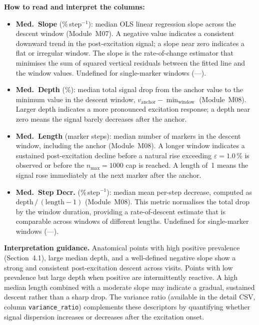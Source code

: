 \documentclass[a4paper,11pt]{article}
\begin{document}
\medskip
\noindent\textbf{How to read and interpret the columns:}

\begin{itemize}

  \item \textbf{Med.\ Slope} (\%\,step$^{-1}$): median OLS linear regression slope across
        the descent window (Module~M07). A negative value indicates a consistent downward
        trend in the post-excitation signal; a slope near zero indicates a flat or irregular
        window. The slope is the rate-of-change estimator that minimises the sum of squared
        vertical residuals between the fitted line and the window values. Undefined for
        single-marker windows (---).

  \item \textbf{Med.\ Depth} (\%): median total signal drop from the anchor value to the
        minimum value in the descent window,
        $v_{\mathrm{anchor}} - \min_{\mathrm{window}}$ (Module~M08). Larger depth indicates
        a more pronounced excitation response; a depth near zero means the signal barely
        decreases after the anchor.

  \item \textbf{Med.\ Length} (marker steps): median number of markers in the descent
        window, including the anchor (Module~M08). A longer window indicates a sustained
        post-excitation decline before a natural rise exceeding
        $\varepsilon = 1.0\,\%$ is observed or before the
        $n_{\max} = 1000$ cap is reached. A length of~1 means the signal rose
        immediately at the next marker after the anchor.

  \item \textbf{Med.\ Step Decr.} (\%\,step$^{-1}$): median mean per-step decrease,
        computed as $\mathrm{depth}\,/\,(\mathrm{length} - 1)$ (Module~M08). This metric
        normalises the total drop by the window duration, providing a rate-of-descent
        estimate that is comparable across windows of different lengths. Undefined for
        single-marker windows (---).

\end{itemize}

\medskip
\noindent\textbf{Interpretation guidance.}
Anatomical points with high positive prevalence (Section~4.1), large median depth, and a
well-defined negative slope show a strong and consistent post-excitation descent across
visits.
Points with low prevalence but large depth when positive are intermittently reactive.
A high median length combined with a moderate slope may indicate a gradual, sustained
descent rather than a sharp drop.
The variance ratio (available in the detail CSV, column \texttt{variance\_ratio}) complements
these descriptors by quantifying whether signal dispersion increases or decreases after the
excitation onset.
\end{document}
